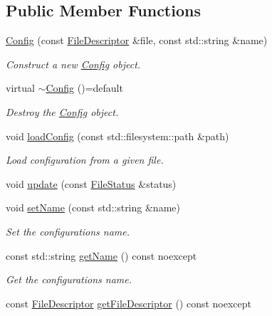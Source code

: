 \subsection*{Public Member Functions}
\begin{DoxyCompactItemize}
\item 
\hyperlink{classcfg_1_1_config_aac0ac15a2f06b8810164441fe08fe490}{Config} (const \hyperlink{namespacecfg_af0aed6e47bd26e91ad7d69467f96caaf}{File\+Descriptor} \&file, const std\+::string \&name)
\begin{DoxyCompactList}\small\item\em Construct a new \hyperlink{classcfg_1_1_config}{Config} object. \end{DoxyCompactList}\item 
virtual \hyperlink{classcfg_1_1_config_a1b74ecb20fb34c56ac3257066e4c065f}{$\sim$\+Config} ()=default
\begin{DoxyCompactList}\small\item\em Destroy the \hyperlink{classcfg_1_1_config}{Config} object. \end{DoxyCompactList}\item 
void \hyperlink{classcfg_1_1_config_a8c2a84783775b02046041628d74be6e7}{load\+Config} (const std\+::filesystem\+::path \&path)
\begin{DoxyCompactList}\small\item\em Load configuration from a given file. \end{DoxyCompactList}\item 
void \hyperlink{classcfg_1_1_config_a622ad4331306ae232060ef6e74fe8134}{update} (const \hyperlink{namespacecfg_a384f743959a9029f7e1c3d11548795de}{File\+Status} \&status)
\item 
void \hyperlink{classcfg_1_1_config_a04f2e4ad0070a73728c4bce7b7dd0c29}{set\+Name} (const std\+::string \&name)
\begin{DoxyCompactList}\small\item\em Set the configuration\textquotesingle{}s name. \end{DoxyCompactList}\item 
const std\+::string \hyperlink{classcfg_1_1_config_ac1fa619b1d5dbd0c3326ac93a4d437bb}{get\+Name} () const noexcept
\begin{DoxyCompactList}\small\item\em Get the configuration\textquotesingle{}s name. \end{DoxyCompactList}\item 
const \hyperlink{namespacecfg_af0aed6e47bd26e91ad7d69467f96caaf}{File\+Descriptor} \hyperlink{classcfg_1_1_config_a76cb1f6d83b6d06eee652c80d32e9084}{get\+File\+Descriptor} () const noexcept

\end{DoxyCompactItemize}
